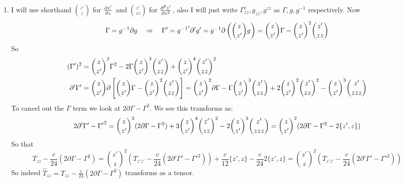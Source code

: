 \documentclass[11pt]{article}
\begin{document}
\begin{enumerate}
	
	Another way to do this is to first look at the general $n$th derivative of the global conformal transformations (the M\"obius transformations). Note that:
	\[
		g = \frac{az+b}{cz+d}, \quad g'(z) = \frac{ad-bc}{(cz+d)^2} = \frac{1}{(cz+d)^2} \quad \Rightarrow \partial^n_z g = \frac{n! (-c)^{n-1}}{(cz+d)^{n+1}}
	\]
	In particular:
	\[
		g''(z) = \frac{-2c}{(cz+d)^3}, \quad g'''(z) = \frac{6c^2}{(cz+d)^4}
	\]
	The simplest combination of $g'$, $g''$, and $g'''$ that can give zero is:
	\[
		(g'')^2 - \frac{2}{3} g'''(z) g'(z)
	\]
	We want this to have units of $[g]/[z]^2$ and to behave as $\epsilon'''(z)$ to leading order when $g = z + \epsilon(z)$. The only way to do this (which fixes overall normalization and all) is to divide through by $-2/3 (g'(z))^2$ and get:
	\[
		\frac{g'''}{g'} - \frac{3}{2} \left(\frac{g''}{g'}\right)^2.
	\]
	It is easy to check that this satisfies the cocycle property for composition, namely:
	\begin{equation}
		\{z_3, z_1 \} = \left( \frac{\partial z_2}{\d z_1} \right)^2 \{z_3, z_2\} +  \{z_2, z_1 \} 
	\end{equation}
	Since for $h = g \circ f$ we get:
	\[
		\frac{h'''}{h'} - \frac32 \left(\frac{h''}{h'}\right)^2 = \frac{f'''}{f'} + 3 \frac{f'' f' g''}{f' g'} + \frac{(f')^3 g'''}{f' g'} - \frac32 \left(\frac{f'' g' + (f')^2 g''}{f' g'} \right)^2 = \{f, z\} + (f')^2 \left( \frac{g'''}{g'} - \frac32 \left(\frac{g''}{g'}\right)^2 \right) = \{f, z\} + (f')^2 \{g, f(z)\}
	\]
	
	\item I will use shorthand ${z' \choose z}$ for $\frac{\partial z'}{\partial z}$ and ${z' \choose z z}$ for $\frac{\partial^2 z'}{\partial z^2}$, also I will just write $\Gamma_{zz}^z, g_{z\bar z}, g^{z \bar z}$ as $\Gamma, g, g^{-1}$ respectively. Now
	\[
		\Gamma = g^{-1} \partial g \quad \Rightarrow \quad \Gamma' = {g^{-1}}' \partial' g' = g^{-1} \partial\left( {z \choose z'} g \right) = {z \choose z'} \Gamma - {z \choose z'}^2 {z' \choose zz}
	\]
	So 
	\[
	\begin{aligned}
			(\Gamma')^2 &= {z \choose z'}^2 \Gamma^2 - 2 \Gamma {z \choose z'}^3 {z' \choose zz} + {z \choose z'}^4 {z' \choose zz}^2 \\
			\partial' \Gamma'&
			= {z \choose z'} \partial \left[{z \choose z'} \Gamma - {z \choose z'}^2 {z' \choose zz} \right]
			=  {z \choose z'}^2 \partial \Gamma
			- \Gamma {z \choose z'}^3 {z' \choose zz}
			+ 2 {z \choose z'}^2 {z' \choose zz}^2
			- {z \choose z'}^3 {z' \choose zzz}
	\end{aligned}
	\]
	To cancel out the $\Gamma$ term we look at $2 \partial \Gamma - \Gamma^2$. We see this transforms as:
	\[
		2 \partial' \Gamma' - {\Gamma'}^2 = {z \choose z'}^2 (2 \partial \Gamma - \Gamma^2) + 3 {z \choose z'}^4 {z' \choose zz}^2 - 2 {z \choose z'}^3 {z' \choose zzz} = {z \choose z'}^2 (2 \partial \Gamma - \Gamma^2 - 2 \{z' , z\})
	\]
	So that
	\[
		T_{zz} - \frac{c}{24} (2 \partial \Gamma - \Gamma^2) = { z' \choose z}^2 (T_{z' z'} - \frac{c}{24} (2 \partial' \Gamma' - {\Gamma'}^2)) + \frac{c}{12} \{z' , z\} - \frac{c}{24} 2 \{z', z\} 
		= { z' \choose z}^2 (T_{z' z'} - \frac{c}{24} (2 \partial' \Gamma' - {\Gamma'}^2))
	\]	
	So indeed $\hat T_{zz}= T_{zz} - \frac{c}{24} (2 \partial \Gamma - \Gamma^2)$ transforms as a tensor.
	

\end{enumerate}
\end{document}
